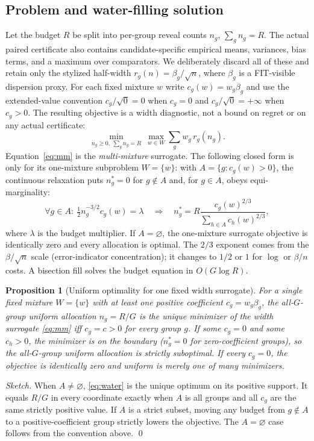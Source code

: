 \documentclass{article}
\newtheorem{proposition}{Proposition}
\begin{document}
\subsection{Problem and water-filling solution}
Let the budget $R$ be split into per-group reveal counts $n_g$, $\sum_g n_g=R$. The actual
paired certificate also contains candidate-specific empirical means, variances, bias terms,
and a maximum over comparators. We deliberately discard all of these and retain only the
stylized half-width $r_g(n)=\beta_g/\sqrt n$, where $\beta_g$ is a FIT-visible dispersion
proxy. For each fixed mixture $w$ write $c_g(w)=w_g\beta_g$ and use the extended-value convention
$c_g/\sqrt{0}=0$ when $c_g=0$ and $c_g/\sqrt{0}=+\infty$ when $c_g>0$. The resulting
objective is a width diagnostic, not a bound on regret or on any actual certificate:
\begin{equation}
  \min_{n_g\ge0,\ \sum_g n_g=R}\ \max_{w\in W}\sum_g w_g\,r_g(n_g).
  \tag{WS}\label{eq:mm}
\end{equation}
Equation~\eqref{eq:mm} is the \emph{multi-mixture} surrogate. The following closed form is
only for its one-mixture subproblem $W=\{w\}$: with $A=\{g:c_g(w)>0\}$, the continuous
relaxation puts $n_g^*=0$ for $g\notin A$ and, for $g\in A$, obeys equi-marginality:
\begin{equation}
  \forall g\in A:\ \tfrac12 n_g^{-3/2}c_g(w)=\lambda
  \quad\Longrightarrow\quad
  n_g^*=R\frac{c_g(w)^{2/3}}{\sum_{h\in A}c_h(w)^{2/3}},
  \label{eq:water}
\end{equation}
where $\lambda$ is the budget multiplier. If $A=\varnothing$, the one-mixture surrogate
objective is identically zero and every allocation is optimal.
The $2/3$ exponent comes from the $\beta/\sqrt n$ scale (error-indicator concentration); it
changes to $1/2$ or $1$ for $\log$ or $\beta/n$ costs. A bisection fill solves the budget
equation in $O(G\log R)$.

\begin{proposition}[Uniform optimality for one fixed width surrogate]
\label{prop:uniform-opt}
For a \emph{single fixed} mixture $W=\{w\}$ with at least one positive coefficient
$c_g=w_g\beta_g$, the all-$G$-group uniform allocation $n_g=R/G$ is the unique minimizer of
the width surrogate \eqref{eq:mm} iff $c_g=c>0$ for \emph{every} group $g$. If some $c_g=0$
and some $c_h>0$, the minimizer is on the boundary ($n_g^*=0$ for zero-coefficient groups), so
the all-$G$-group uniform allocation is strictly suboptimal. If every $c_g=0$, the objective is
identically zero and uniform is merely one of many minimizers.
\end{proposition}
\begin{proof}[Sketch]
When $A\ne\varnothing$, \eqref{eq:water} is the unique optimum on its positive support.
It equals $R/G$ in every coordinate exactly when $A$ is all groups and all $c_g$ are the same
strictly positive value. If $A$ is a strict subset, moving any budget from $g\notin A$ to a
positive-coefficient group strictly lowers the objective. The $A=\varnothing$ case follows
from the convention above. \qed
\end{proof}
\end{document}
